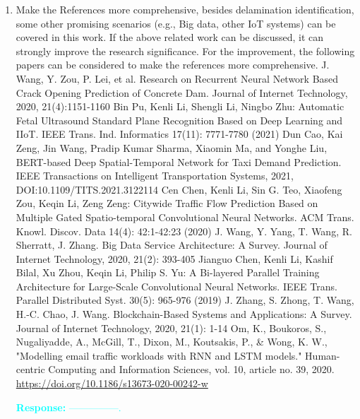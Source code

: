 \documentclass[11pt,a2paper]{report}
\begin{document}
\begin{enumerate}
			\item Make the References more comprehensive, besides delamination 
			identification, some other promising scenarios (e.g., Big data, 
			other IoT systems) can be covered in this work. If the above 
			related work can be discussed, it can strongly improve the research 
			significance. For the improvement, the following papers can be 
			considered to make the references more comprehensive.
			\newline
			\newline
			\newline
			J. Wang, Y. Zou, P. Lei, et al. Research on Recurrent Neural 
			Network Based Crack Opening Prediction of Concrete Dam. Journal of 
			Internet Technology, 2020, 21(4):1151-1160
			\newline
			\newline
			Bin Pu, Kenli Li, Shengli Li, Ningbo Zhu: Automatic Fetal 
			Ultrasound Standard Plane Recognition Based on Deep Learning and 
			IIoT. IEEE Trans. Ind. Informatics 17(11): 7771-7780 (2021)
			\newline
			\newline
			Dun Cao, Kai Zeng, Jin Wang, Pradip Kumar Sharma, Xiaomin Ma, and 
			Yonghe Liu, BERT-based Deep Spatial-Temporal Network for Taxi 
			Demand 
			Prediction. IEEE Transactions on Intelligent Transportation 
			Systems, 2021, DOI:10.1109/TITS.2021.3122114
			\newline
			\newline
			Cen Chen, Kenli Li, Sin G. Teo, Xiaofeng Zou, Keqin Li, Zeng Zeng: 
			Citywide Traffic Flow Prediction Based on Multiple Gated 
			Spatio-temporal Convolutional Neural Networks. ACM Trans. Knowl. 
			Discov. Data 14(4): 42:1-42:23 (2020)
			\newline
			\newline
			J. Wang, Y. Yang, T. Wang, R. Sherratt, J. Zhang. Big Data Service 
			Architecture: A Survey. Journal of Internet Technology, 2020, 
			21(2): 393-405
			\newline
			\newline
			Jianguo Chen, Kenli Li, Kashif Bilal, Xu Zhou, Keqin Li, Philip S. 
			Yu: A Bi-layered Parallel Training Architecture for Large-Scale 
			Convolutional Neural Networks. IEEE Trans. Parallel Distributed 
			Syst. 30(5): 965-976 (2019)
			\newline
			\newline
			J. Zhang, S. Zhong, T. Wang, H.-C. Chao, J. Wang. Blockchain-Based 
			Systems and Applications: A Survey. Journal of Internet Technology, 
			2020, 21(1): 1-14
			\newline
			\newline
			Om, K., Boukoros, S., Nugaliyadde, A., McGill, T., Dixon, M., 
			Koutsakis, P., \& Wong, K. W., "Modelling email traffic workloads 
			with RNN and LSTM models." Human-centric Computing and Information 
			Sciences, vol. 10, article no. 39, 2020. 
			\url{https://doi.org/10.1186/s13673-020-00242-w}
			

\textcolor{Cyan}{
	\textbf{Response:}
	---------------.
}	
\end{enumerate}	
	
\end{document}
